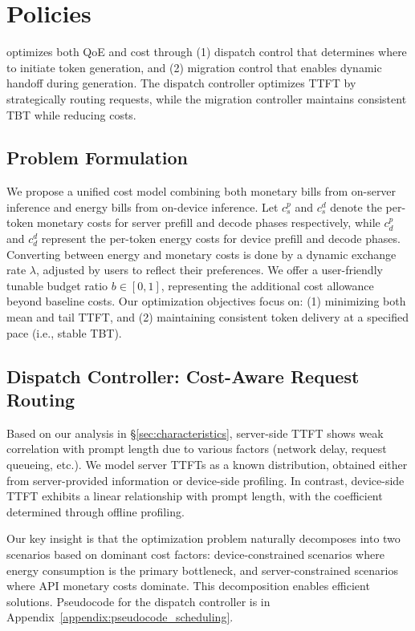 \section{\disco{} Policies}
\label{sec:disco_policy}

\disco{} optimizes both QoE and cost through (1) dispatch control that determines where to initiate token generation, and (2) migration control that enables dynamic handoff during generation. The dispatch controller optimizes TTFT by strategically routing requests, while the migration controller maintains consistent TBT while reducing costs.

\subsection{Problem Formulation}
\label{subsec:model}
We propose a unified cost model combining both monetary bills from on-server inference and energy bills from on-device inference. Let $c^p_s$ and $c^d_s$ denote the per-token monetary costs for server prefill and decode phases respectively, while $c^p_d$ and $c^d_d$ represent the per-token energy costs for device prefill and decode phases. Converting between energy and monetary costs is done by a dynamic exchange rate $\lambda$, adjusted by users to reflect their preferences. We offer a user-friendly tunable budget ratio $b \in [0,1]$, representing the additional cost allowance beyond baseline costs. Our optimization objectives focus on: (1) minimizing both mean and tail TTFT, and (2) maintaining consistent token delivery at a specified pace (i.e., stable TBT).

\subsection{Dispatch Controller: Cost-Aware Request Routing}
\label{subsec:ttft_opt}
Based on our analysis in \S\ref{sec:characteristics}, server-side TTFT shows weak correlation with prompt length due to various factors (network delay, request queueing, etc.). We model server TTFTs as a known distribution, obtained either from server-provided information or device-side profiling. In contrast, device-side TTFT exhibits a linear relationship with prompt length, with the coefficient determined through offline profiling. 

Our key insight is that the optimization problem naturally decomposes into two scenarios based on dominant cost factors: device-constrained scenarios where energy consumption is the primary bottleneck, and server-constrained scenarios where API monetary costs dominate. This decomposition enables efficient solutions. Pseudocode for the dispatch controller is in Appendix~\ref{appendix:pseudocode_scheduling}.

